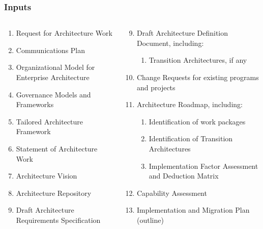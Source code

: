 \documentclass[aspectratio=169, table]{beamer}
\begin{document}
	\begin{frame}
		\frametitle{Inputs}
		\vspace{22pt}
		\begin{columns}[onlytextwidth]
			\begin{column}{0.45\textwidth}
				\begin{enumerate}
					\item Request for Architecture Work
					\item Communications Plan
					\item Organizational Model for Enterprise Architecture
					\item Governance Models and Frameworks
					\item Tailored Architecture Framework
					\item Statement of Architecture Work
					\item Architecture Vision
					\item Architecture Repository
					\item Draft Architecture Requirements Specification
				\end{enumerate}
				
			\end{column}
			\begin{column}{0.55\textwidth}
				\begin{enumerate}
					\setcounter{enumi}{8}
					\item Draft Architecture Definition Document, including:
					\begin{enumerate}
						\item Transition Architectures, if any
					\end{enumerate}
					\item Change Requests for existing programs and projects
					\item Architecture Roadmap, including:
					\begin{enumerate}
						\item Identification of work packages
						\item Identification of Transition Architectures
						\item Implementation Factor Assessment and Deduction Matrix
					\end{enumerate}
					\item Capability Assessment
					\item Implementation and Migration Plan (outline)
				\end{enumerate}
			\end{column}
		\end{columns}
	\end{frame}
	
\end{document}
